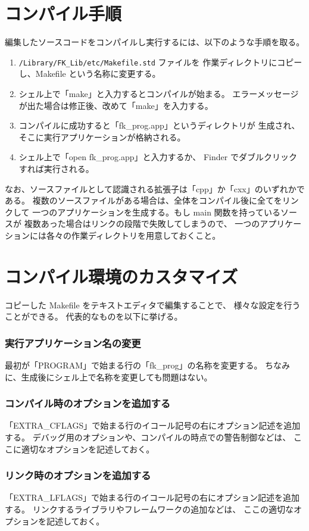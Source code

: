 \documentclass[a4paper]{jsarticle}
\begin{document}
\section{コンパイル手順}
編集したソースコードをコンパイルし実行するには、以下のような手順を取る。
\begin{enumerate}
 \item \verb+/Library/FK_Lib/etc/Makefile.std+ ファイルを
	作業ディレクトリにコピーし、Makefile という名称に変更する。
 \item シェル上で「make」と入力するとコンパイルが始まる。
	エラーメッセージが出た場合は修正後、改めて「make」を入力する。
 \item コンパイルに成功すると「fk\_prog.app」というディレクトリが
	生成され、そこに実行アプリケーションが格納される。
 \item シェル上で「open fk\_prog.app」と入力するか、
	Finder でダブルクリックすれば実行される。
\end{enumerate}
なお、ソースファイルとして認識される拡張子は「cpp」か「cxx」のいずれかである。
複数のソースファイルがある場合は、全体をコンパイル後に全てをリンクして
一つのアプリケーションを生成する。もし main 関数を持っているソースが
複数あった場合はリンクの段階で失敗してしまうので、
一つのアプリケーションには各々の作業ディレクトリを用意しておくこと。

\section{コンパイル環境のカスタマイズ}
コピーした Makefile をテキストエディタで編集することで、
様々な設定を行うことができる。
代表的なものを以下に挙げる。
\subsubsection*{実行アプリケーション名の変更}
最初が「PROGRAM」で始まる行の「fk\_prog」の名称を変更する。
ちなみに、生成後にシェル上で名称を変更しても問題はない。
\subsubsection*{コンパイル時のオプションを追加する}
「EXTRA\_CFLAGS」で始まる行のイコール記号の右にオプション記述を追加する。
デバッグ用のオプションや、コンパイルの時点での警告制御などは、
ここに適切なオプションを記述しておく。
\subsubsection*{リンク時のオプションを追加する}
「EXTRA\_LFLAGS」で始まる行のイコール記号の右にオプション記述を追加する。
リンクするライブラリやフレームワークの追加などは、
ここの適切なオプションを記述しておく。
\end{document}
